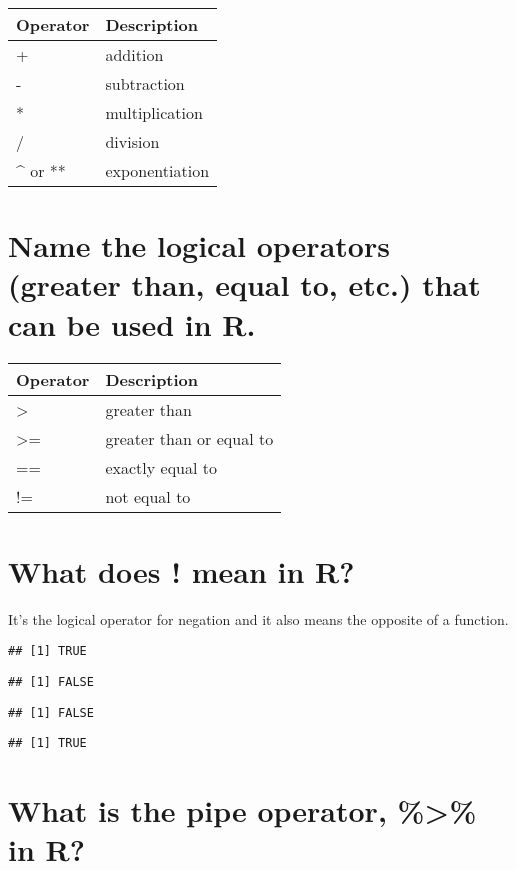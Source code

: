 \documentclass[
]{article}
\begin{document}
\begin{longtable}[]{@{}ll@{}}
\toprule
Operator & Description\tabularnewline
\midrule
\endhead
+ & addition\tabularnewline
- & subtraction\tabularnewline
* & multiplication\tabularnewline
/ & division\tabularnewline
\^{} or ** & exponentiation\tabularnewline
\bottomrule
\end{longtable}

\hypertarget{name-the-logical-operators-greater-than-equal-to-etc.-that-can-be-used-in-r.}{%
\section{Name the logical operators (greater than, equal to, etc.) that
can be used in
R.}\label{name-the-logical-operators-greater-than-equal-to-etc.-that-can-be-used-in-r.}}

\begin{longtable}[]{@{}ll@{}}
\toprule
Operator & Description\tabularnewline
\midrule
\endhead
\textgreater{} & greater than\tabularnewline
\textgreater= & greater than or equal to\tabularnewline
== & exactly equal to\tabularnewline
!= & not equal to\tabularnewline
\bottomrule
\end{longtable}

\hypertarget{what-does-mean-in-r}{%
\section{What does ! mean in R?}\label{what-does-mean-in-r}}

It's the logical operator for negation and it also means the opposite of
a function.

\begin{verbatim}
## [1] TRUE
\end{verbatim}

\begin{verbatim}
## [1] FALSE
\end{verbatim}

\begin{verbatim}
## [1] FALSE
\end{verbatim}

\begin{verbatim}
## [1] TRUE
\end{verbatim}

\hypertarget{what-is-the-pipe-operator-in-r}{%
\section{What is the pipe operator, \%\textgreater\% in
R?}\label{what-is-the-pipe-operator-in-r}}
\end{document}
